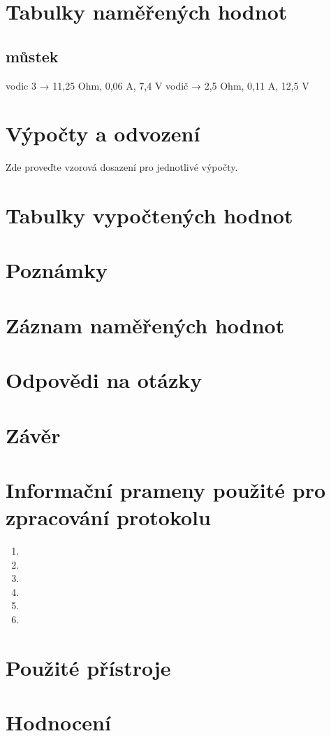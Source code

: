\documentclass[a4]{article}
\begin{document}
\section{Tabulky naměřených hodnot}
\subsection{můstek}
vodic 3 → 11,25 Ohm, 0,06 A, 7,4 V
vodič → 2,5 Ohm, 0,11 A, 12,5 V

\section{Výpočty a odvození}
Zde proveďte vzorová dosazení pro jednotlivé výpočty.

\section{Tabulky vypočtených hodnot}


\section{Poznámky}

\section{Záznam naměřených hodnot}



\section{Odpovědi na otázky}

\section{Závěr}

\section{Informační prameny použité pro zpracování protokolu}
\begin{enumerate}
    \item {\dotfill}
    \item {\dotfill}
    \item {\dotfill}
    \item {\dotfill}
    \item {\dotfill}
    \item {\dotfill}
\end{enumerate}


\section{Použité přístroje}

\section{Hodnocení}
\end{document}
